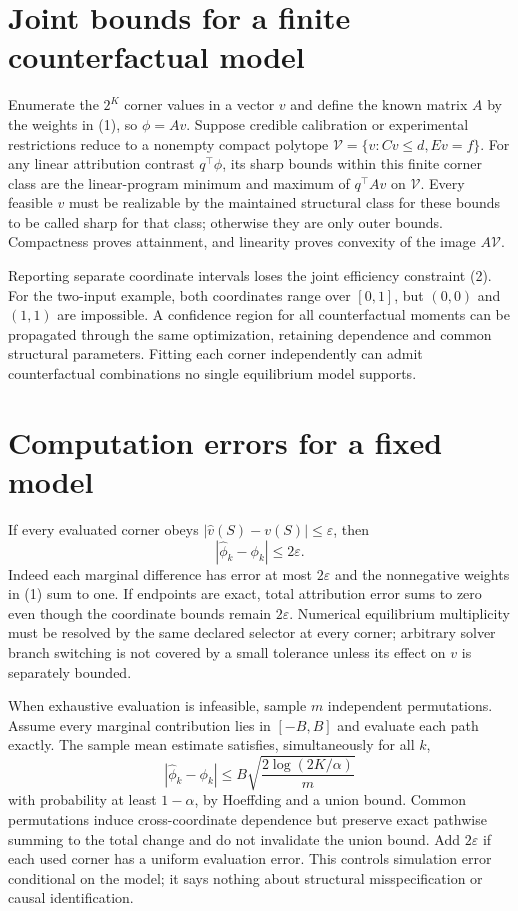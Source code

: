 \documentclass[11pt]{article}
\theoremstyle{definition}
\begin{document}
\section*{Joint bounds for a finite counterfactual model}
Enumerate the $2^K$ corner values in a vector $v$ and define the known matrix
$A$ by the weights in (1), so $\phi=Av$. Suppose credible calibration or
experimental restrictions reduce to a nonempty compact polytope
$\mathcal V=\{v:Cv\le d,Ev=f\}$. For any linear attribution contrast
$q^{\top}\phi$, its sharp bounds within this finite corner class are the
linear-program minimum and maximum of $q^{\top}Av$ on $\mathcal V$.
Every feasible $v$ must be realizable by the maintained structural class for
these bounds to be called sharp for that class; otherwise they are only outer
bounds. Compactness proves attainment, and linearity proves convexity of the
image $A\mathcal V$.

Reporting separate coordinate intervals loses the joint efficiency constraint
(2). For the two-input example, both coordinates range over $[0,1]$, but
$(0,0)$ and $(1,1)$ are impossible. A confidence region for all counterfactual
moments can be propagated through the same optimization, retaining dependence
and common structural parameters. Fitting each corner independently can admit
counterfactual combinations no single equilibrium model supports.

\section*{Computation errors for a fixed model}
If every evaluated corner obeys $|\widehat v(S)-v(S)|\le\varepsilon$, then
\[
 |\widehat\phi_k-\phi_k|\le2\varepsilon.                 \tag{4}
\]
Indeed each marginal difference has error at most $2\varepsilon$ and the
nonnegative weights in (1) sum to one. If endpoints are exact, total attribution
error sums to zero even though the coordinate bounds remain $2\varepsilon$.
Numerical equilibrium multiplicity must be resolved by the same declared
selector at every corner; arbitrary solver branch switching is not covered by
a small tolerance unless its effect on $v$ is separately bounded.

When exhaustive evaluation is infeasible, sample $m$ independent permutations.
Assume every marginal contribution lies in $[-B,B]$ and evaluate each path
exactly. The sample mean estimate satisfies, simultaneously for all $k$,
\[
 |\widehat\phi_k-\phi_k|
 \le B\sqrt{\frac{2\log(2K/\alpha)}m}
\]
with probability at least $1-\alpha$, by Hoeffding and a union bound. Common
permutations induce cross-coordinate dependence but preserve exact pathwise
summing to the total change and do not invalidate the union bound. Add
$2\varepsilon$ if each used corner has a uniform evaluation error. This controls
simulation error conditional on the model; it says nothing about structural
misspecification or causal identification.
\end{document}
